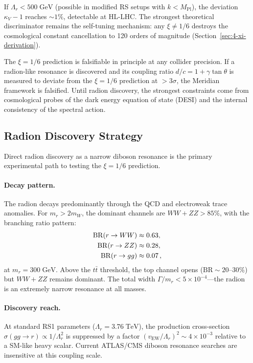 If $\Lambda_r < 500\;\mathrm{GeV}$ (possible in modified RS setups with $k < M_{\mathrm{Pl}}$), the deviation $\kappa_V - 1$ reaches $\sim 1\%$, detectable at HL-LHC. The strongest theoretical discriminator remains the self-tuning mechanism: any $\xi \neq 1/6$ destroys the cosmological constant cancellation to 120 orders of magnitude (Section~\ref{sec:4-xi-derivation}).

\begin{remark}\label{rmk:4-falsification}
The $\xi = 1/6$ prediction is falsifiable in principle at any collider precision. If a radion-like resonance is discovered and its coupling ratio $d/c = 1 + \gamma\tan\theta$ is measured to deviate from the $\xi = 1/6$ prediction at $> 3\sigma$, the Meridian framework is falsified. Until radion discovery, the strongest constraints come from cosmological probes of the dark energy equation of state (DESI) and the internal consistency of the spectral action.
\end{remark}

\subsection{Radion Discovery Strategy}
\label{sec:4-radion-discovery}

Direct radion discovery as a narrow diboson resonance is the primary experimental path to testing the $\xi = 1/6$ prediction.

\paragraph{Decay pattern.} The radion decays predominantly through the QCD and electroweak trace anomalies.  For $m_r > 2m_W$, the dominant channels are $WW + ZZ > 85\%$, with the branching ratio pattern:
\begin{align}
  \mathrm{BR}(r \to WW) &\approx 0.63, \notag\\
  \mathrm{BR}(r \to ZZ) &\approx 0.28, \notag\\
  \mathrm{BR}(r \to gg) &\approx 0.07\,,
  \label{eq:4-radion-BR}
\end{align}
at $m_r = 300\;\mathrm{GeV}$.  Above the $t\bar{t}$ threshold, the top channel opens ($\mathrm{BR} \sim 20$--$30\%$) but $WW + ZZ$ remains dominant.  The total width $\Gamma/m_r < 5 \times 10^{-4}$---the radion is an extremely narrow resonance at all masses.

\paragraph{Discovery reach.} At standard RS1 parameters ($\Lambda_r = 3.76\;\mathrm{TeV}$), the production cross-section $\sigma(gg \to r) \propto 1/\Lambda_r^2$ is suppressed by a factor $(v_{\mathrm{EW}}/\Lambda_r)^2 \sim 4 \times 10^{-3}$ relative to a SM-like heavy scalar.  Current ATLAS/CMS diboson resonance searches are insensitive at this coupling scale.

